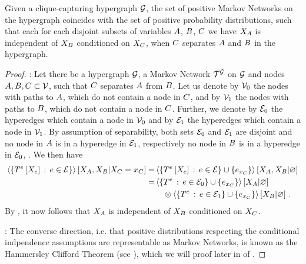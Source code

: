 \begin{theorem}
    \label{the:condIndMN}
    Given a clique-capturing hypergraph $\mathcal{G}$, the set of positive Markov Networks on the hypergraph coincides with the set of positive probability distributions, such that each for each disjoint subsets of variables $A$, $B$, $C$ we have $X_{A}$ is independent of $X_{B}$ conditioned on $X_{C}$, when $C$ separates $A$ and $B$ in the hypergraph. %
\end{theorem}
\begin{proof}
    \proofrightsymbol:
    Let there be a hypergraph $\mathcal{G}$, a Markov Network $\mathcal{T}^{\mathcal{G}}$ on $\mathcal{G}$ and nodes $A,B,C \subset \mathcal{V}$, such that $C$ separates $A$ from $B$.
    Let us denote by $\mathcal{V}_0$ the nodes with paths to $A$, which do not contain a node in $C$, and by $\mathcal{V}_1$ the nodes with paths to $B$, which do not contain a node in $C$.
    Further, we denote by $\mathcal{E}_0$ the hyperedges which contain a node in $\mathcal{V}_0$ and by $\mathcal{E}_1$ the hyperedges which contain a node in $\mathcal{V}_1$.
    By assumption of separability, both sets $\mathcal{E}_0$ and $\mathcal{E}_1$ are disjoint and no node in $A$ is in a hyperedge in $\mathcal{E}_1$, respectively no node in $B$ is in a hyperedge in $\mathcal{E}_0$, .
    We then have
    \begin{align*}
        \left\langle \left\{T^{e}\left[X_{e}\right]\, : \, e\in\mathcal{E}\right\}\right\rangle \left[ X_{A},X_{B} | X_{C}=x_{C} \right]
        = & \left\langle \left\{T^{e}\left[X_{e}\right]\, : \, e\in\mathcal{E}\right\}\cup\{e_{x_{C}}\}\right\rangle \left[ X_{A},X_{B} | \varnothing \right] \\
        = &  \left\langle \{T^{e}\, : \, e\in\mathcal{E}_0\}\cup\{e_{x_{C}}\}\right\rangle \left[ X_{A} | \varnothing \right] \\
        & \quad \otimes \left\langle \{T^{e}\, : \, e\in\mathcal{E}_1\}\cup\{e_{x_{C}}\}\right\rangle \left[ X_{B} | \varnothing \right] \, .
    \end{align*}
    By , it now follows that $X_{A}$ is independent of $X_{B}$ conditioned on $X_{C}$.

    \proofleftsymbol:
    The converse direction, i.e. that positive distributions respecting the conditional indpendence assumptions are representable as Markov Networks, is known as the Hammersley Clifford Theorem (see \cite{clifford_markov_1971}), which we will proof later in  of .
\end{proof}

